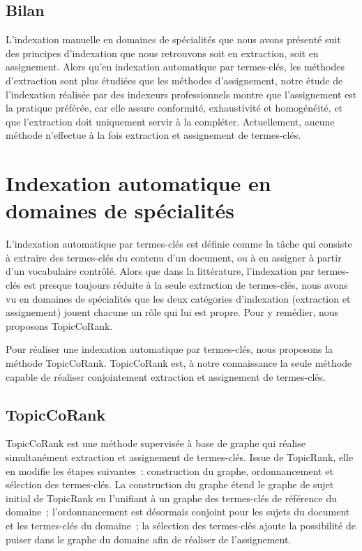     \subsection{Bilan}
    \label{subsec:main-domain_specific_keyphrase_annotation-manual_keyphrase_annotation-conclusion}
      L'indexation manuelle en domaines de spécialités que nous avons présenté
      suit des principes d'indexation que nous retrouvons soit en extraction,
      soit en assignement. Alors qu'en indexation automatique par termes-clés,
      les méthodes d'extraction sont plus étudiées que les méthodes
      d'assignement, notre étude de l'indexation réalisée par des indexeurs
      professionnels montre que l'assignement est la pratique préférée, car elle
      assure conformité, exhaustivité et homogénéité, et que l'extraction doit
      uniquement servir à la compléter. Actuellement, aucune méthode n'effectue
      à la fois extraction et assignement de termes-clés.


  \section{Indexation automatique en domaines de spécialités}
  \label{sec:main-domain_specific_keyphrase_annotation-supervised_automatic_keyphrase_extraction}
    L'indexation automatique par termes-clés est définie comme la tâche qui
    consiste à extraire des termes-clés du contenu d'un document, ou à en
    assigner à partir d'un vocabulaire contrôlé. Alors que dans la
    littérature, l'indexation par termes-clés est presque toujours réduite à la
    seule extraction de termes-clés, nous avons vu en domaines de spécialités
    que les deux catégories d'indexation (extraction et assignement) jouent
    chacune un rôle qui lui est propre. Pour y remédier, nous proposons
    TopicCoRank.

    Pour réaliser une indexation automatique par termes-clés, nous proposons la
    méthode TopicCoRank. TopicCoRank est, à notre connaissance la seule méthode
    capable de réaliser conjointement extraction et assignement de termes-clés.

    \subsection{TopicCoRank}
    \label{subsec:main-domain_specific_keyphrase_annotation-supervised_automatic_keyphrase_annotation-topiccorank}
      TopicCoRank est une méthode supervisée à base de graphe qui réalise
      simultanément extraction et assignement de termes-clés. Issue de
      TopicRank, elle en modifie les étapes suivantes~: construction du graphe,
      ordonnancement et sélection des termes-clés. La construction du graphe
      étend le graphe de sujet initial de TopicRank en l'unifiant à un graphe
      des termes-clés de référence du domaine~; l'ordonnancement est désormais
      conjoint pour les sujets du document et les termes-clés du domaine~; la
      sélection des termes-clés ajoute la possibilité de puiser dans le graphe
      du domaine afin de réaliser de l'assignement.

